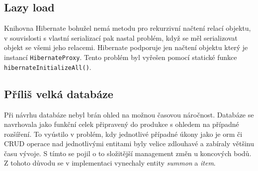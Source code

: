 \subsection{Lazy load}
Knihovna Hibernate bohužel nemá metodu pro rekurzivní načtení relací objektu, v souvislosti s vlastní serializací pak nastal problém, když se měl serializovat objekt se všemi jeho relacemi. Hibernate podporuje jen načtení objektu který je instancí \texttt{HibernateProxy}. Tento problém byl vyřešen pomocí statické funkce \texttt{hibernateInitializeAll()}. 

\subsection{Příliš velká databáze}
Při návrhu databáze nebyl brán ohled na možnou časovou náročnost. Databáze se navrhovala jako funkční celek připravený do produkce s ohledem na případné rozšíření. To vyústilo v problém, kdy jednotlivé případné úkony jako je \gls{orm} či CRUD operace nad jednotlivými entitami byly velice zdlouhavé a zabíraly většinu času vývoje. S tímto se pojil o to složitější management změn u koncových bodů. Z tohoto důvodu se v implementaci vynechaly entity \textit{summon} a \textit{item}.
